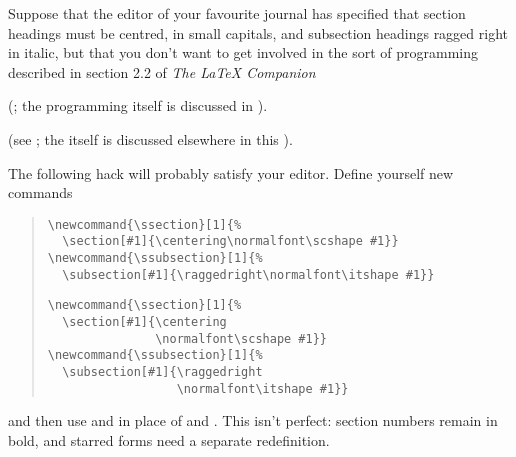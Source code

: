 Suppose that the editor of your favourite journal has specified that section
headings must be centred, in small capitals, and subsection headings ragged 
right in italic, but that you don't want to get involved in the sort of
programming described in section 2.2 of \emph{The \LaTeX{} Companion}
\begin{narrowversion} %
  (; the programming itself is discussed in
  ).
\end{narrowversion}
\begin{wideversion} %
  (see ; the
   itself is discussed elsewhere in this
  ).
\end{wideversion}
The following hack will 
probably satisfy your editor. Define yourself new commands
\begin{quote}
\begin{wideversion}
\begin{verbatim}
\newcommand{\ssection}[1]{%
  \section[#1]{\centering\normalfont\scshape #1}}
\newcommand{\ssubsection}[1]{%
  \subsection[#1]{\raggedright\normalfont\itshape #1}}
\end{verbatim}
\end{wideversion}
\begin{narrowversion} %
\begin{verbatim}
\newcommand{\ssection}[1]{%
  \section[#1]{\centering
               \normalfont\scshape #1}}
\newcommand{\ssubsection}[1]{%
  \subsection[#1]{\raggedright
                  \normalfont\itshape #1}}
\end{verbatim}
\end{narrowversion}
\end{quote}
and then use  and  in place of
 and . This isn't perfect: section numbers
remain in bold, and starred forms need a separate redefinition.

